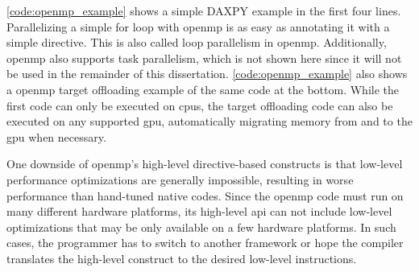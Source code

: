 \autoref{code:openmp_example} shows a simple DAXPY example in the first four lines. 
Parallelizing a simple for loop with \gls{openmp} is as easy as annotating it with a simple  directive. 
This is also called loop parallelism in \gls{openmp}. 
Additionally, \gls{openmp} also supports task parallelism, which is not shown here since it will not be used in the remainder of this dissertation. 
\autoref{code:openmp_example} also shows a \gls{openmp} target offloading example of the same code at the bottom. 
While the first code can only be executed on \glspl{cpu}, the target offloading code can also be executed on any supported \gls{gpu}, automatically migrating memory from and to the \gls{gpu} when necessary. 

One downside of \gls{openmp}'s high-level directive-based constructs is that low-level performance optimizations are generally impossible, resulting in worse performance than hand-tuned native codes. 
Since the \gls{openmp} code must run on many different hardware platforms, its high-level \gls{api} can not include low-level optimizations that may be only available on a few hardware platforms. 
In such cases, the programmer has to switch to another framework or hope the compiler translates the high-level construct to the desired low-level instructions. 



